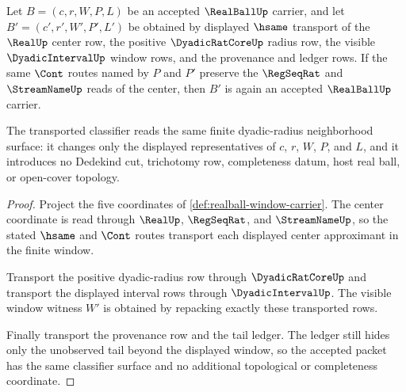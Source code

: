 \begin{theorem}
\label{thm:realball-radius-transport}
Let $B=(c,r,W,P,L)$ be an accepted $\RealBallUp$ carrier, and let $B'=(c',r',W',P',L')$ be obtained by displayed $\hsame$ transport of the $\RealUp$ center row, the positive $\DyadicRatCoreUp$ radius row, the visible $\DyadicIntervalUp$ window rows, and the provenance and ledger rows. If the same $\Cont$ routes named by $P$ and $P'$ preserve the $\RegSeqRat$ and $\StreamNameUp$ reads of the center, then $B'$ is again an accepted $\RealBallUp$ carrier.

The transported classifier reads the same finite dyadic-radius neighborhood surface: it changes only the displayed representatives of $c$, $r$, $W$, $P$, and $L$, and it introduces no Dedekind cut, trichotomy row, completeness datum, host real ball, or open-cover topology.
\end{theorem}
\begin{proof}
Project the five coordinates of \autoref{def:realball-window-carrier}. The center coordinate is read through $\RealUp$, $\RegSeqRat$, and $\StreamNameUp$, so the stated $\hsame$ and $\Cont$ routes transport each displayed center approximant in the finite window.

Transport the positive dyadic-radius row through $\DyadicRatCoreUp$ and transport the displayed interval rows through $\DyadicIntervalUp$. The visible window witness $W'$ is obtained by repacking exactly these transported rows.

Finally transport the provenance row and the tail ledger. The ledger still hides only the unobserved tail beyond the displayed window, so the accepted packet has the same classifier surface and no additional topological or completeness coordinate.
\end{proof}

